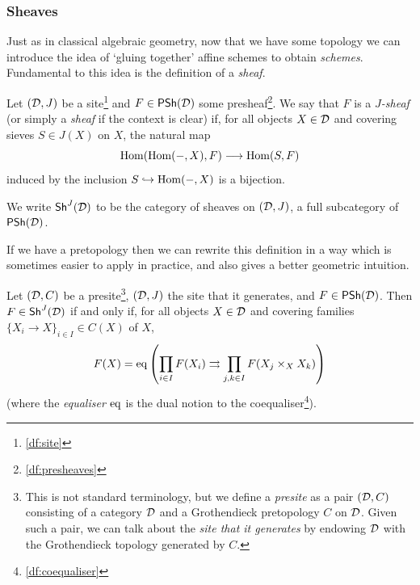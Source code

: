 

    \subsubsection{Sheaves} %
    \label{ssub:sheaves}

        Just as in classical algebraic geometry, now that we have some topology we can introduce the idea of `gluing together' affine schemes to obtain \emph{schemes}.
        Fundamental to this idea is the definition of a \emph{sheaf}.

        \begin{definition}\label{df:sheaves-on-site}
            Let $(\mathcal{D},J)$ be a site\footnote{
                \cref{df:site}
            } and $F\in\mathsf{PSh}(\mathcal{D})$ some presheaf\footnote{
                \cref{df:presheaves}
            }.
            We say that $F$ is a \emph{$J$-sheaf} (or simply a \emph{sheaf} if the context is clear) if, for all objects $X\in\mathcal{D}$ and covering sieves $S\in J(X)$ on $X$, the natural map
            \begin{equation*}
                \operatorname{Hom}(\operatorname{Hom}({-}, X), F)\longrightarrow\operatorname{Hom}(S,F)
            \end{equation*}
            induced by the inclusion $S\hookrightarrow\operatorname{Hom}({-}, X)$ is a bijection.

            We write $\mathsf{Sh}^J(\mathcal{D})$ to be the category of sheaves on $(\mathcal{D},J)$, a full subcategory of $\mathsf{PSh}(\mathcal{D})$.
        \end{definition}

        If we have a pretopology then we can rewrite this definition in a way which is sometimes easier to apply in practice, and also gives a better geometric intuition.

        \begin{lemma}\label{le:sheaves-on-presite}
            Let $(\mathcal{D}, C)$ be a presite\footnote{
                This is not standard terminology, but we define a \emph{presite} as a pair $(\mathcal{D},C)$ consisting of a category $\mathcal{D}$ and a Grothendieck pretopology $C$ on $\mathcal{D}$.
                Given such a pair, we can talk about the \emph{site that it generates} by endowing $\mathcal{D}$ with the Grothendieck topology generated by $C$.
            }, $(\mathcal{D}, J)$ the site that it generates, and $F\in\mathsf{PSh}(\mathcal{D})$.
            Then $F\in\mathsf{Sh}^{J}(\mathcal{D})$ if and only if, for all objects $X\in\mathcal{D}$ and covering families $\{X_i\to X\}_{i\in I}\in C(X)$ of $X$,
            \begin{equation*}
                F(X) = \operatorname{eq}\left( \prod_{i\in I}F(X_i)\rightrightarrows\prod_{j,k\in I}F(X_j\times_X X_k) \right)
            \end{equation*}
            (where the \emph{equaliser} $\operatorname{eq}$ is the dual notion to the coequaliser\footnote{
                \cref{df:coequaliser}
            }).
        \end{lemma}

